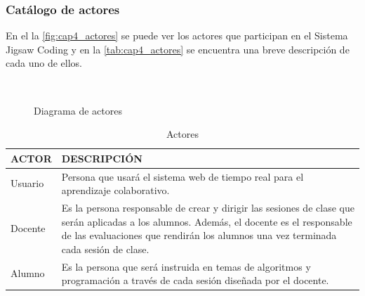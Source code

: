 \subsubsection{Catálogo de actores}
En el la \autoref{fig:cap4_actores} se puede ver los actores que participan en el Sistema Jigsaw Coding y en la \autoref{tab:cap4_actores} se encuentra una breve descripción de cada uno de ellos.
\begin{figure}[h]
	\centering
	\\
	\caption[Diagrama de actores]{Diagrama de actores}
	\label{fig:cap4_actores}
\end{figure}
\begin{longtable}{L{3cm}L{7cm}}
	\caption{Actores}
	\label{tab:cap4_actores}\\
	\toprule[0.8mm]
	ACTOR & DESCRIPCIÓN \\
	\midrule[0.6mm]
	Usuario & Persona que usará el sistema web de tiempo real para el aprendizaje colaborativo.\\
	\midrule
	Docente & Es la persona responsable de crear y dirigir las sesiones de clase que serán aplicadas a los alumnos. Además, el docente es el responsable de las evaluaciones que rendirán los alumnos una vez terminada cada sesión de clase.\\
	\midrule
	Alumno & Es la persona que será instruida en temas de algoritmos y programación a través de cada sesión diseñada por el docente.\\
	\bottomrule[0.8mm]
\end{longtable}

